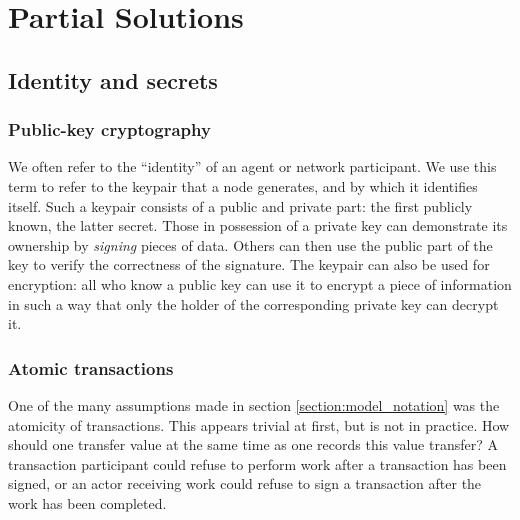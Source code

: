 \chapter{Partial Solutions}
\section{Identity and secrets}
\subsection{Public-key cryptography}
We often refer to the ``identity'' of an agent or network participant. We use this term to refer to the keypair that a node generates, and by which it identifies itself. Such a keypair consists of a public and private part: the first publicly known, the latter secret. Those in possession of a private key can demonstrate its ownership by \emph{signing} pieces of data. Others can then use the public part of the key to verify the correctness of the signature. The keypair can also be used for encryption: all who know a public key can use it to encrypt a piece of information in such a way that only the holder of the corresponding private key can decrypt it.

\subsection{Atomic transactions}
One of the many assumptions made in section \ref{section:model_notation} was the atomicity of transactions. 
This appears trivial at first, but is not in practice. 
How should one transfer value at the same time as one records this value transfer? 
A transaction participant could refuse to perform work after a transaction has been signed, 
or an actor receiving work could refuse to sign a transaction after the work has been completed.

